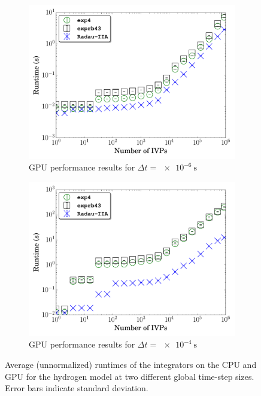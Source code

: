 \documentclass[preprint,review,11pt]{elsarticle}
\begin{document}
\begin{figure}[htbp]
\begin{subfigure}{0.49\textwidth}
  \end{subfigure}\\
  \begin{subfigure}{0.49\textwidth}
      \includegraphics[width=\linewidth]{H2_1e-06_gpu_nonorm.pdf}
      \caption{GPU performance results for $\Delta t = \SI{e-6}{\second}$}
  \end{subfigure}
  \begin{subfigure}{0.49\textwidth}
      \includegraphics[width=\linewidth]{H2_1e-04_gpu_nonorm.pdf}
      \caption{GPU performance results for $\Delta t = \SI{e-4}{\second}$}
  \end{subfigure}
  \caption{Average (unnormalized) runtimes of the integrators on the CPU and GPU for the hydrogen model at two different global time-step sizes.
  Error bars indicate standard deviation.}
  \label{F:raw_perf_H2CO}
\end{figure}
\end{document}
